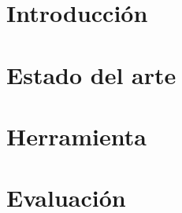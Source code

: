 















% 

\chapter{Introducci\'on}


\chapter{Estado del arte}


\chapter{Herramienta}


\chapter{Evaluaci\'on}







